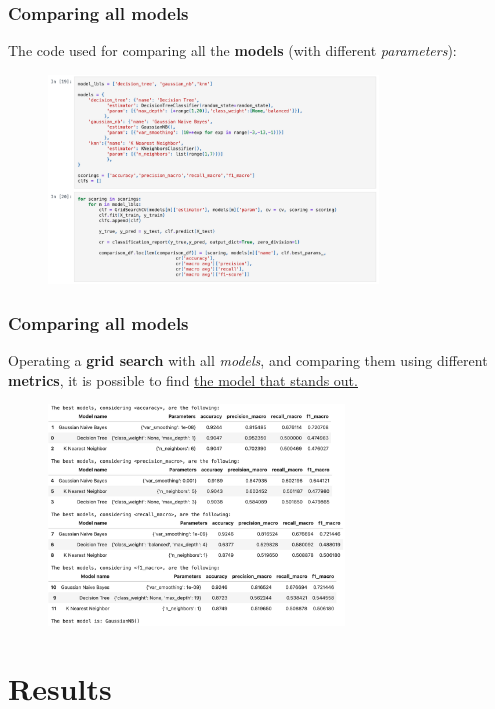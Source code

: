 \documentclass{beamer}
\begin{document}
\begin{frame}
\frametitle{Comparing all models}
The code used for comparing all the \textbf{models} (with different \textit{parameters}):
\begin{figure}
\centering
    \includegraphics[width=0.78\textwidth]{imgs/comparisons.png}
    \label{fig:comparisons}
\end{figure}
\end{frame}

\begin{frame}
\frametitle{Comparing all models}
Operating a \textbf{grid search} with all \textit{models}, and comparing them using different \textbf{metrics}, it is possible to find \underline{the model that stands out.}
\begin{figure}
\centering
    \includegraphics[width=0.7\textwidth]{imgs/testing.png}
    \label{fig:testing}
\end{figure}
\end{frame}


\section{Results}
\end{document}
